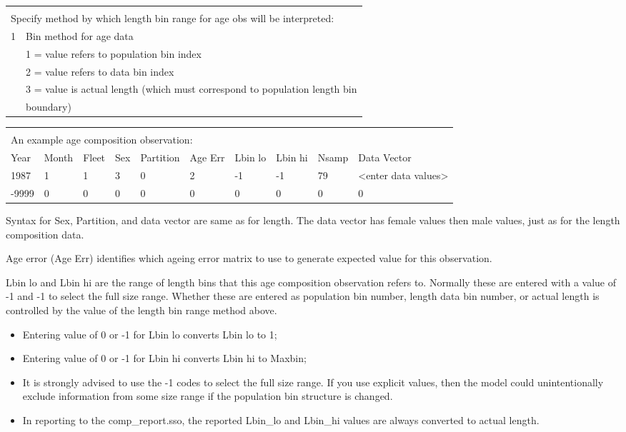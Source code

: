 			
\begin{tabular}{p{1cm} p{14cm}}
	 & \\
	\multicolumn{2}{l}{Specify method by which length bin range for age obs will be interpreted:}\\
	\hline
	1 & Bin method for age data \Tstrut\\
	  & 1 = value refers to population bin index\\
	  & 2 = value refers to data bin index\\
	  & 3 = value is actual length (which must correspond to population length bin  \\
	  & boundary)\Bstrut\\
	 \hline
\end{tabular}


\begin{tabular}{p{1cm} p{1cm} p{1cm} p{1cm} p{1.5cm} p{1cm} p{1cm} p{1cm} p{1cm} p{2.1cm}}
	\multicolumn{10}{l}{ }\\
	\multicolumn{10}{l}{An example age composition observation:}\\
	\hline
	Year & Month & Fleet & Sex & Partition & Age Err & Lbin lo & Lbin hi & Nsamp & Data Vector \Tstrut\\
	\hline
	1987 & 1 & 1 & 3 & 0 & 2 & -1 & -1 & 79 & <enter data values>\Tstrut\\
	-9999 & 0 & 0 & 0 & 0 & 0 & 0 & 0 & 0 & 0\Bstrut\\
	\hline
\end{tabular}

Syntax for Sex, Partition, and data vector are same as for length. The data vector has female values then male values, just as for the length composition data.

\pagebreak

Age error (Age Err) identifies which ageing error matrix to use to generate expected value for this observation.

Lbin lo and Lbin hi are the range of length bins that this age composition observation refers to.  Normally these are entered with a value of -1 and -1 to select the full size range.  Whether these are entered as population bin number, length data bin number, or actual length is controlled by the value of the length bin range method above.

\begin{itemize}
	\item Entering value of 0 or -1 for Lbin lo converts Lbin lo to 1;
	\item Entering value of 0 or -1 for Lbin hi converts Lbin hi to Maxbin;
	\item It is strongly advised to use the -1 codes to select the full size range.  If you use explicit values, then the model could unintentionally exclude information from some size range if the population bin structure is changed.
	\item In reporting to the comp\_report.sso, the reported Lbin\_lo and Lbin\_hi values are always converted to actual length.
\end{itemize}

